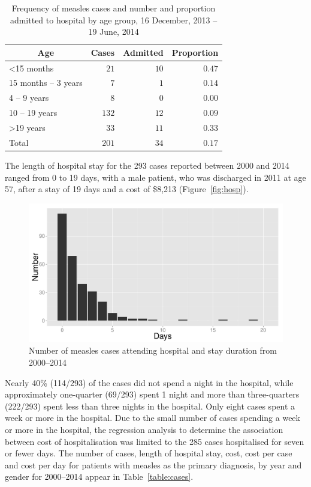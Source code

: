 \documentclass{article}
\begin{document}
\begin{table}
\caption{Frequency of measles cases and number and proportion admitted to hospital by age group, 16 December, 2013 -- 19 June, 2014}
\begin{center}
\begin{tabular}{lrrr}
\hline\hline
\multicolumn{1}{c}{Age}&\multicolumn{1}{c}{Cases}&\multicolumn{1}{c}{Admitted}&\multicolumn{1}{c}{Proportion}\tabularnewline
\hline
\textless 15 months&$ 21$&$10$&$0.47$\tabularnewline
15 months – 3 years&$  7$&$ 1$&$0.14$\tabularnewline
4 – 9 years&$  8$&$ 0$&$0.00$\tabularnewline
10 – 19 years&$132$&$12$&$0.09$\tabularnewline
\textgreater 19 years&$ 33$&$11$&$0.33$\tabularnewline
Total&$201$&$34$&$0.17$\tabularnewline
\hline
\end{tabular}\end{center}\label{table:freq}
\end{table}

The length of hospital stay for the 293 cases reported between 2000 and 2014 ranged from 0 to 19 days, with a male patient, who was discharged in 2011 at age 57, after a stay of 19 days and a cost of \$8,213 (Figure~\autoref{fig:hosp}).


\begin{figure}
\begin{center}
\includegraphics{draftfinalreport-053}
\end{center}
\caption{Number of measles cases attending hospital and stay duration from 2000--2014}
\label{fig:hosp}
\end{figure}

Nearly 40\% (114/293) of the cases did not spend a night in the hospital, while approximately one-quarter (69/293) spent 1 night and more than three-quarters (222/293) spent less than three nights in the hospital. Only eight cases spent a week or more in the hospital. Due to the small number of cases spending a week or more in the hospital, the regression analysis to determine the association between cost of hospitalisation was limited to the 285 cases hospitalised for seven or fewer days. The number of cases, length of hospital stay, cost, cost per case and cost per day for patients with measles as the primary diagnosis, by year and gender for 2000--2014 appear in Table~\autoref{table:cases}.
\end{document}
